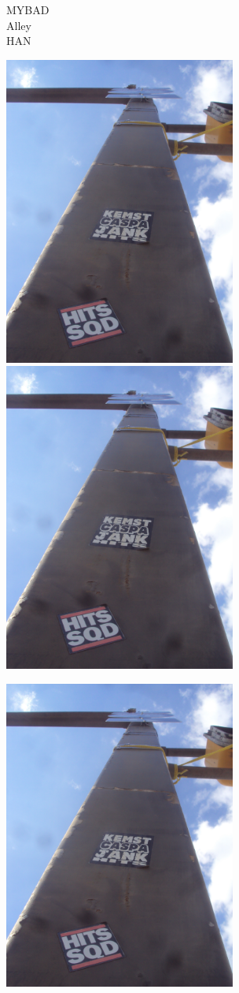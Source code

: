 \documentclass[10pt,letterpaper]{article}
\begin{document}
MYBAD\\
Alley\\
HAN\\
\pagebreak

\includegraphics[height=4in]{portrait.jpg}
\includegraphics[height=4in]{portrait.jpg}

\includegraphics[height=4in]{portrait.jpg}
\end{document}
